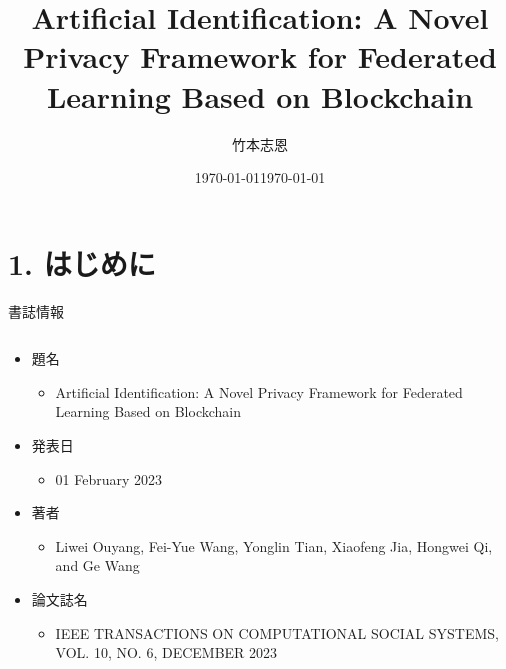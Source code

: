 \documentclass[unicode,12pt,aspectratio=169, dvipdfmx]{beamer}
\title{Artificial Identification: A Novel Privacy Framework for Federated Learning Based on Blockchain}
\author{竹本志恩}
\date{\today}
\date[]{\today}
\institute{INIAD}
\begin{document}
    \frame{\maketitle}
    \section{1. はじめに}
    \begin{frame}{書誌情報}
        \begin{columns}
            \begin{column}{.8\linewidth}
                \begin{itemize}
                    \item 題名
                    \begin{itemize}
                        \item Artificial Identification: A Novel Privacy Framework for Federated Learning Based on Blockchain
                    \end{itemize}
                    
                    \item 発表日
                    \begin{itemize}
                        \item 01 February 2023
                    \end{itemize}

                    \item 著者
                    \begin{itemize}
                        \item Liwei Ouyang, Fei-Yue Wang, Yonglin Tian, Xiaofeng Jia, Hongwei Qi, and Ge Wang
                    \end{itemize}

                    \item 論文誌名
                    \begin{itemize}
                        \item IEEE TRANSACTIONS ON COMPUTATIONAL SOCIAL SYSTEMS, VOL. 10, NO. 6, DECEMBER 2023
                    \end{itemize}
                \end{itemize}          
            \end{column}
        \end{columns}
    \end{frame}
\end{document}
